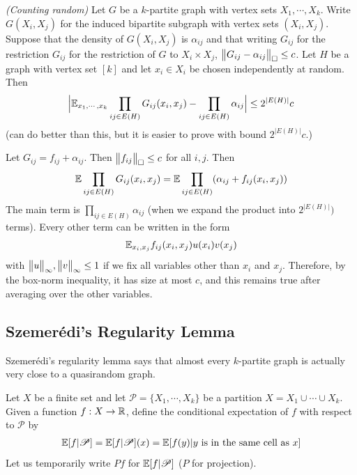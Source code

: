 \documentclass[12pt,a4paper]{report}
\newenvironment{proof}
{\begin{changemargin}{1cm}{0.5cm}
	}%
	{\end{changemargin}
}
\begin{document}
 \emph{(Counting random)} Let $G$ be a $k$-partite graph with vertex sets $X_1, \cdots, X_k$. Write $G(X_i, X_j)$ for the induced bipartite subgraph with vertex sets $(X_i, X_j)$. Suppose that the density of $G(X_i, X_j)$ is $\alpha_{ij}$ and that writing $G_{ij}$ for the restriction $G_{ij}$ for the restriction of $G$ to $X_i \times X_j$, $\bigl\lVert G_{ij} - \alpha_{ij}\bigr\rVert_{\tiny{\square}} \leq c$. Let $H$ be a graph with vertex set $[k]$ and let $x_i \in X_i$ be chosen independently at random. Then
\begin{align*}
\Big| \mathbb{E}_{x_1, \cdots, x_k} \prod_{ij \in E(H)} G_{ij} (x_i, x_j) - \prod_{ij\in E(H)} \alpha_{ij} \Big| \leq 2^{|E(H)|} c
\end{align*}
(can do better than this, but it is easier to prove with bound $2^{|E(H)|} c$.)
\begin{proof}
\pf Let $G_{ij} = f_{ij} + \alpha_{ij}$. Then $\bigl\lVert f_{ij}\bigr\rVert_{\tiny{\square}} \leq c$ for all $i,j$. Then
\begin{align*}
\mathbb{E} \prod_{ij \in E(H)} G_{ij}(x_i,x_j) = \mathbb{E} \prod_{ij\in E(H)} (\alpha_{ij} + f_{ij}(x_i, x_j))
\end{align*}
The main term is $\prod_{ij\in E(H)} \alpha_{ij}$ (when we expand the product into $2^{|E(H)|})$ terms). Every other term can be written in the form
\begin{align*}
\mathbb{E}_{x_i, x_j} f_{ij}(x_i,x_j) u(x_i) v(x_j)
\end{align*}
with $\bigl\lVert u\bigr\rVert_{\infty},\bigl\lVert v\bigr\rVert_{\infty} \leq 1$ if we fix all variables other than $x_i$ and $x_j$. Therefore, by the box-norm inequality, it has size at most $c$, and this remains true after averaging over the other variables. 

\eop
\end{proof}
\s

\subsection*{Szemer\'{e}di's Regularity Lemma}

Szemer\'{e}di's regularity lemma says that almost every $k$-partite graph is actually very close to a quasirandom graph.
\s

Let $X$ be a finite set and let $\mathscr{P}= \{ X_1, \cdots, X_k \}$ be a partition $X=X_1 \cup \cdots \cup X_k$. Given a function $f: X\rightarrow \mathbb{R}$, define the conditional expectation of $f$ with respect to $\mathscr{P}$ by
\begin{align*}
\mathbb{E} [f | \mathscr{P}] = \mathbb{E}[f|\mathscr{P}](x) = \mathbb{E}[f(y) | y \text{ is in the same cell as } x]
\end{align*}
Let us temporarily write $Pf$ for $\mathbb{E}[f|\mathscr{P}]$ ($P$ for projection).
\s
\end{document}
